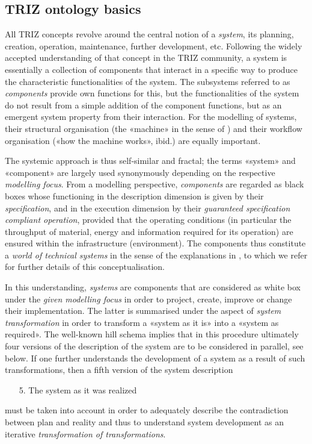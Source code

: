 \documentclass[11pt,a4paper]{article}
\begin{document}
\subsection{TRIZ ontology basics}

All TRIZ concepts revolve around the central notion of a \emph{system}, its
planning, creation, operation, maintenance, further development, etc.
Following the widely accepted understanding of that concept in the TRIZ
community, a system is essentially a collection of components that interact in
a specific way to produce the characteristic functionalities of the system.
The subsystems referred to as \emph{components} provide own functions for
this, but the functionalities of the system do not result from a simple
addition of the component functions, but as an emergent system property from
their interaction. For the modelling of systems, their structural organisation
(the «machine» in the sense of \cite{TT}) and their workflow organisation
(«how the machine works», ibid.)  are equally important.

The systemic approach is thus self-similar and fractal; the terms «system» and
«component» are largely used synonymously depending on the respective
\emph{modelling focus}.  From a modelling perspective, \emph{components} are
regarded as black boxes whose functioning in the description dimension is
given by their \emph{specification}, and in the execution dimension by their
\emph{guaranteed specification compliant operation}, provided that the
operating conditions (in particular the throughput of material, energy and
information required for its operation) are ensured within the infrastructure
(environment). The components thus constitute a \emph{world of technical
  systems} in the sense of the explanations in \cite{Graebe2020}, to which we
refer for further details of this conceptualisation.

In this understanding, \emph{systems} are components that are considered as
white box under the \emph{given modelling focus} in order to project, create,
improve or change their implementation. The latter is summarised under the
aspect of \emph{system transformation} in order to transform a «system as it
is» into a «system as required». The well-known hill schema implies that in
this procedure ultimately four versions of the description of the system are
to be considered in parallel, see below. If one further understands the
development of a system as a result of such transformations, then a fifth
version of the system description
\begin{itemize}
\item[5.] The system as it was realized
\end{itemize}
must be taken into account in order to adequately describe the contradiction
between plan and reality and thus to understand system development as an
iterative \emph{transformation of transformations}.
\end{document}
